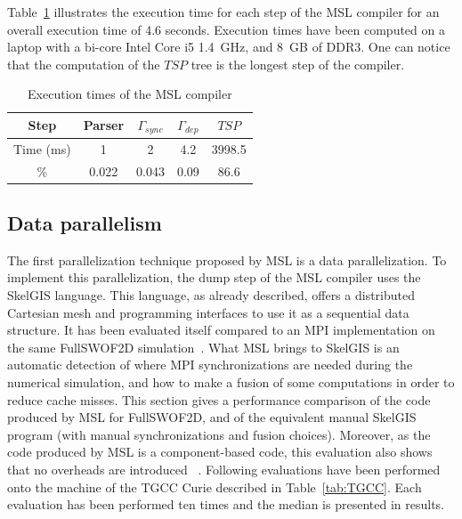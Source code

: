 Table~\ref{fig:exectime} illustrates the execution time for each step of the MSL compiler for an overall execution time of 4.6 seconds. Execution times have been computed on a laptop with a bi-core Intel Core i5 1.4~GHz, and 8~GB of DDR3. One can notice that the computation of the $TSP$ tree is the longest step of the compiler.

\begin{table}[!h]
 \begin{center}
 \begin{tabular}{|c|c|c|c|c|}
  \hline
   Step & Parser & $\Gamma_{sync}$ & $\Gamma_{dep}$ & $TSP$\\
   \hline
   Time (ms) & 1 & 2 & 4.2 & 3998.5\\
   \hline
   \% & 0.022 & 0.043 & 0.09 & 86.6\\
   \hline
 \end{tabular}
\caption{Execution times of the MSL compiler}
\label{fig:exectime}
 \end{center}
\end{table}

\subsection{Data parallelism}

The first parallelization technique proposed by MSL is a data parallelization. To implement this parallelization, the dump step of the MSL compiler uses the SkelGIS language. This language, as already described, offers a distributed Cartesian mesh and programming interfaces to use it as a sequential data structure. It has been evaluated itself compared to an MPI implementation on the same FullSWOF2D simulation~\cite{}. What MSL brings to SkelGIS is an automatic detection of where MPI synchronizations are needed during the numerical simulation, and how to make a fusion of some computations in order to reduce cache misses. This section gives a performance comparison of the code produced by MSL for FullSWOF2D, and of the equivalent manual SkelGIS program (with manual synchronizations and fusion choices). Moreover, as the code produced by MSL is a component-based code, this evaluation also shows that no overheads are introduced \llc~\cite{}. Following evaluations have been performed onto the machine of the TGCC Curie described in Table~\ref{tab:TGCC}. Each evaluation has been performed ten times and the median is presented in results.


